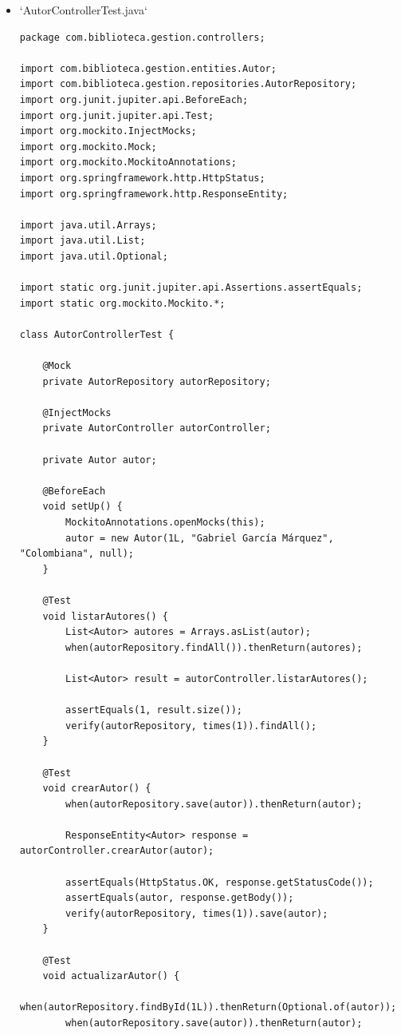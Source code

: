 \documentclass[11pt]{article}
\begin{document}
\begin{itemize}
\item `AutorControllerTest.java`
\label{sec:org9e43154}

\begin{verbatim}
package com.biblioteca.gestion.controllers;

import com.biblioteca.gestion.entities.Autor;
import com.biblioteca.gestion.repositories.AutorRepository;
import org.junit.jupiter.api.BeforeEach;
import org.junit.jupiter.api.Test;
import org.mockito.InjectMocks;
import org.mockito.Mock;
import org.mockito.MockitoAnnotations;
import org.springframework.http.HttpStatus;
import org.springframework.http.ResponseEntity;

import java.util.Arrays;
import java.util.List;
import java.util.Optional;

import static org.junit.jupiter.api.Assertions.assertEquals;
import static org.mockito.Mockito.*;

class AutorControllerTest {

    @Mock
    private AutorRepository autorRepository;

    @InjectMocks
    private AutorController autorController;

    private Autor autor;

    @BeforeEach
    void setUp() {
        MockitoAnnotations.openMocks(this);
        autor = new Autor(1L, "Gabriel García Márquez", "Colombiana", null);
    }

    @Test
    void listarAutores() {
        List<Autor> autores = Arrays.asList(autor);
        when(autorRepository.findAll()).thenReturn(autores);

        List<Autor> result = autorController.listarAutores();

        assertEquals(1, result.size());
        verify(autorRepository, times(1)).findAll();
    }

    @Test
    void crearAutor() {
        when(autorRepository.save(autor)).thenReturn(autor);

        ResponseEntity<Autor> response = autorController.crearAutor(autor);

        assertEquals(HttpStatus.OK, response.getStatusCode());
        assertEquals(autor, response.getBody());
        verify(autorRepository, times(1)).save(autor);
    }

    @Test
    void actualizarAutor() {
        when(autorRepository.findById(1L)).thenReturn(Optional.of(autor));
        when(autorRepository.save(autor)).thenReturn(autor);


\end{verbatim}
\end{itemize}
\end{document}
